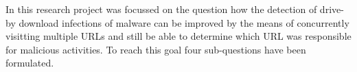 

In this research project was focussed on the question how the detection of drive-by download infections of malware can be improved by the means of concurrently visitting multiple URLs and still be able to determine which URL was responsible for malicious activities. To reach this goal four sub-questions have been formulated.

